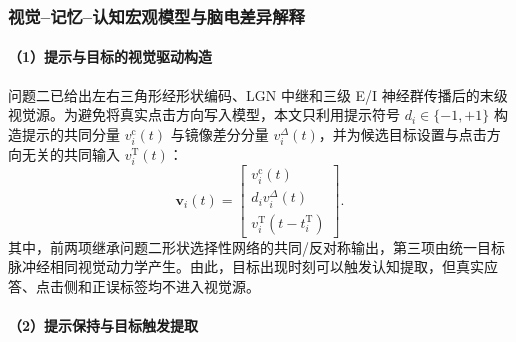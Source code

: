 \documentclass[a4paper,zihao=-4,linespread=1]{ctexart}
\numberwithin{figure}{section}       %
\begin{document}
\subsubsection{视觉--记忆--认知宏观模型与脑电差异解释}

\paragraph{（1）提示与目标的视觉驱动构造}

问题二已给出左右三角形经形状编码、LGN 中继和三级 E/I 神经群传播后的末级视觉源。为避免将真实点击方向写入模型，本文只利用提示符号 $d_i\in\{-1,+1\}$ 构造提示的共同分量 $v_i^{\mathrm c}(t)$ 与镜像差分分量 $v_i^{\Delta}(t)$，并为候选目标设置与点击方向无关的共同输入 $v_i^{\mathrm T}(t)$：
\begin{equation}
\boldsymbol v_i(t)=
\begin{bmatrix}
v_i^{\mathrm c}(t)\\ d_i v_i^{\Delta}(t)\\ v_i^{\mathrm T}(t-t_i^{\mathrm T})
\end{bmatrix}.
\tag{3-3}
\label{eq:q3_visual_input}
\end{equation}
其中，前两项继承问题二形状选择性网络的共同/反对称输出，第三项由统一目标脉冲经相同视觉动力学产生。由此，目标出现时刻可以触发认知提取，但真实应答、点击侧和正误标签均不进入视觉源。

\paragraph{（2）提示保持与目标触发提取}
\end{document}
